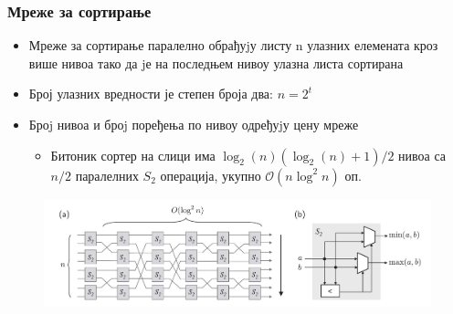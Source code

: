 
\begin{frame}
\frametitle{Мреже за сортирање}

 \begin{itemize}
  \item \alert{Мреже за сортирање} паралелно обрађуjу листу n улазних елемената кроз више нивоа тако да jе на последњем нивоу улазна листа сортирана
  \item Број улазних вредности је степен броја два: $n = 2^t$
  \item Броj нивоа и броj поређења по нивоу одређуjу цену мреже
  \begin{itemize}
   \item Битоник сортер на слици има $\log_{2}(n)(\log_{2}(n)+1)/2$ нивоа са $n/2$ паралелних $S_2$ операција, укупно $\mathcal{O}(n\log^2 n)$ оп.
  \end{itemize}
 \end{itemize}

 \begin{figure}[H]
   \centering
       \includegraphics[scale=0.15]{slike/bitonicStages.pdf}
 \end{figure}

\end{frame}

